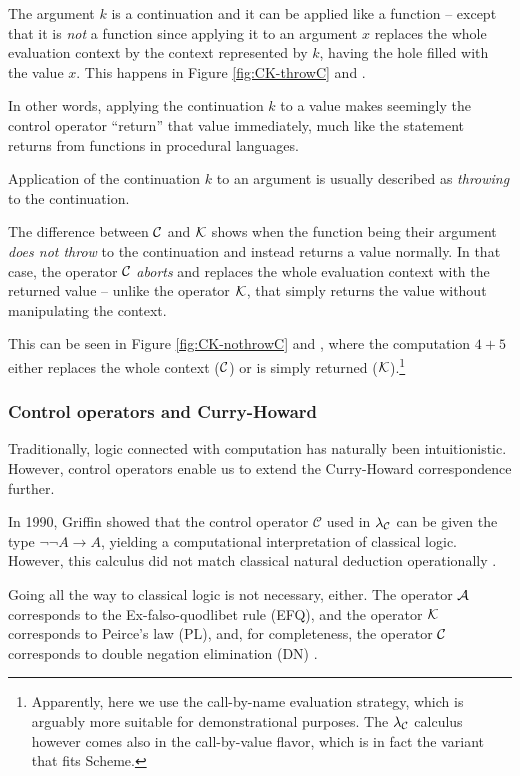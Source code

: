 The argument $k$ is a continuation and it can be applied like a function -- except that it
is \emph{not} a function since applying it to an argument $x$ replaces the whole evaluation
context by the context represented by $k$, having the hole filled with the value $x$.
This happens in Figure \ref{fig:CK-throwC} and .

In other words, applying the continuation $k$ to a value makes seemingly the control operator
``return'' that value immediately, much like the  statement returns from functions
in procedural languages.

Application of the continuation $k$ to an argument is usually described as
\emph{throwing} to the continuation.

The difference between $\mathcal{C}$ and $\mathcal{K}$ shows when the function being their argument
\emph{does not throw} to the continuation and instead returns a value normally. In that case,
the operator $\mathcal{C}$ \emph{aborts} and replaces the whole evaluation context with the returned
value -- unlike the operator $\mathcal{K}$, that simply returns the value without manipulating
the context.

This can be seen in Figure \ref{fig:CK-nothrowC} and , where the
computation $4 + 5$ either replaces the whole context ($\mathcal{C}$) or is simply returned
($\mathcal{K}$).\footnote{Apparently, here we use the call-by-name evaluation strategy, which
is arguably more suitable for demonstrational purposes. The $\lambda_{\mathcal{C}}$ calculus however comes
also in the call-by-value flavor, which is in fact the variant that fits Scheme.}

\subsubsection{Control operators and Curry-Howard}

Traditionally, logic connected with computation has naturally been intuitionistic.
However, control operators enable us to extend the Curry-Howard correspondence
further.

In 1990, Griffin showed \cite{griffin90} that the control operator $\mathcal{C}$
used in $\lambda_{\mathcal{C}}$ can be given the type $\neg \neg A \to A$, yielding a computational
interpretation of classical logic. However, this calculus did not match
classical natural deduction operationally \cite{ariola-herbelin}.

Going all the way to classical logic is not necessary, either. The operator $\mathcal{A}$
corresponds to the Ex-falso-quodlibet rule (EFQ), and the  operator $\mathcal{K}$
corresponds to Peirce's law (PL), and, for completeness, the operator $\mathcal{C}$
corresponds to double negation elimination (DN) \cite[p.~877]{ariola-herbelin}.

